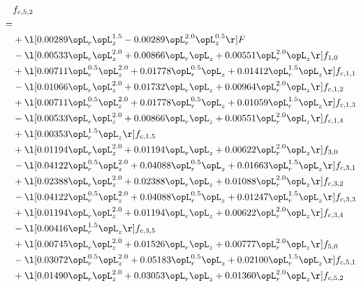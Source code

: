 \begin{alignat}{2} 
\label{eq:f_52_1} 
& f_{c,5,2} \nonumber \\ 
 = \\ 
& + \l[  0.00289 \opL_r \opL_z^{1.5}   -0.00289 \opL_r^{2.0} \opL_z^{0.5}  \r] F \nonumber \\ 
& - \l[  0.00533 \opL_r \opL_z^{2.0} +  0.00866 \opL_r \opL_z +  0.00551 \opL_r^{2.0} \opL_z  \r] f_{1,0} \nonumber \\ 
& + \l[  0.00711 \opL_r^{0.5} \opL_z^{2.0} +  0.01778 \opL_r^{0.5} \opL_z +  0.01412 \opL_r^{1.5} \opL_z  \r] f_{c,1,1} \nonumber \\ 
& - \l[  0.01066 \opL_r \opL_z^{2.0} +  0.01732 \opL_r \opL_z +  0.00964 \opL_r^{2.0} \opL_z  \r] f_{c,1,2} \nonumber \\ 
& + \l[  0.00711 \opL_r^{0.5} \opL_z^{2.0} +  0.01778 \opL_r^{0.5} \opL_z +  0.01059 \opL_r^{1.5} \opL_z  \r] f_{c,1,3} \nonumber \\ 
& - \l[  0.00533 \opL_r \opL_z^{2.0} +  0.00866 \opL_r \opL_z +  0.00551 \opL_r^{2.0} \opL_z  \r] f_{c,1,4} \nonumber \\ 
& + \l[  0.00353 \opL_r^{1.5} \opL_z  \r] f_{c,1,5} \nonumber \\ 
& + \l[  0.01194 \opL_r \opL_z^{2.0} +  0.01194 \opL_r \opL_z +  0.00622 \opL_r^{2.0} \opL_z  \r] f_{3,0} \nonumber \\ 
& - \l[  0.04122 \opL_r^{0.5} \opL_z^{2.0} +  0.04088 \opL_r^{0.5} \opL_z +  0.01663 \opL_r^{1.5} \opL_z  \r] f_{c,3,1} \nonumber \\ 
& + \l[  0.02388 \opL_r \opL_z^{2.0} +  0.02388 \opL_r \opL_z +  0.01088 \opL_r^{2.0} \opL_z  \r] f_{c,3,2} \nonumber \\ 
& - \l[  0.04122 \opL_r^{0.5} \opL_z^{2.0} +  0.04088 \opL_r^{0.5} \opL_z +  0.01247 \opL_r^{1.5} \opL_z  \r] f_{c,3,3} \nonumber \\ 
& + \l[  0.01194 \opL_r \opL_z^{2.0} +  0.01194 \opL_r \opL_z +  0.00622 \opL_r^{2.0} \opL_z  \r] f_{c,3,4} \nonumber \\ 
& - \l[  0.00416 \opL_r^{1.5} \opL_z  \r] f_{c,3,5} \nonumber \\ 
& + \l[  0.00745 \opL_r \opL_z^{2.0} +  0.01526 \opL_r \opL_z +  0.00777 \opL_r^{2.0} \opL_z  \r] f_{5,0} \nonumber \\ 
& - \l[  0.03072 \opL_r^{0.5} \opL_z^{2.0} +  0.05183 \opL_r^{0.5} \opL_z +  0.02100 \opL_r^{1.5} \opL_z  \r] f_{c,5,1} \nonumber \\ 
& + \l[  0.01490 \opL_r \opL_z^{2.0} +  0.03053 \opL_r \opL_z +  0.01360 \opL_r^{2.0} \opL_z  \r] f_{c,5,2} \nonumber \\ 

\end{alignat}
